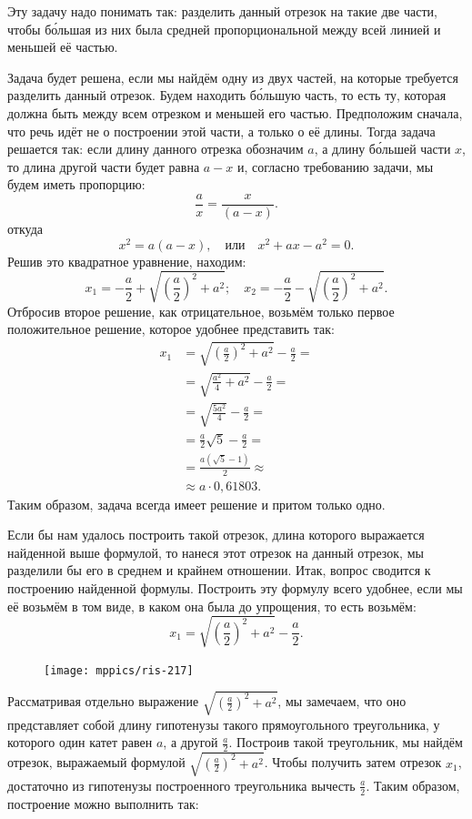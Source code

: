 \documentclass[twoside]{book}
\begin{document}
Эту задачу надо понимать так:
разделить данный отрезок на такие две части, чтобы б\'{о}льшая из них была средней пропорциональной между всей линией и меньшей её частью.

Задача будет решена, если мы найдём одну из двух частей, на которые требуется разделить данный отрезок.
Будем находить б\'{о}льшую часть, то есть ту, которая должна быть  между всем отрезком и меньшей его частью.
Предположим сначала, что речь идёт не о построении этой части, а только о  её длины.
Тогда задача решается  так:
если длину данного отрезка обозначим $a$, а длину б\'{о}льшей части $x$, то длина другой части будет равна $a-x$ и, согласно требованию задачи, мы будем иметь пропорцию:
\[\frac ax=\frac x{(a-x)}.\]
откуда
\[x^2=a(a-x),
\quad\text{или}\quad
x^2+ax-a^2=0.\]
Решив это квадратное уравнение, находим:
\[
x_1=-\frac a2 + \sqrt{\left(\frac a2\right)^2+a^2};
\quad
x_2=-\frac a2 - \sqrt{\left(\frac a2\right)^2+a^2}.
\]
Отбросив второе решение, как отрицательное, возьмём только первое положительное решение, которое удобнее представить так:
\begin{align*}
x_1&= \sqrt{\left(\frac a2\right)^2+a^2}-\frac a2 =
\\
&= \sqrt{\frac {a^2}4+a^2}-\frac a2 =
\\
&= \sqrt{\frac {5a^2}4}-\frac a2 =
\\
&= \frac a2\sqrt{5}-\frac a2 =
\\
&= \frac {a(\sqrt{5}-1)}2 \approx
\\
&\approx a\cdot 0{,}61803.
\end{align*}
Таким образом, задача всегда имеет решение и притом только одно.

Если бы нам удалось построить такой отрезок, длина которого выражается найденной выше формулой, то нанеся этот отрезок на данный отрезок, мы разделили бы его в среднем и крайнем отношении.
Итак, вопрос сводится к построению найденной формулы.
Построить эту формулу всего удобнее, если мы её возьмём в том виде, в каком она была до упрощения, то есть возьмём:
\[x_1= \sqrt{\left(\frac a2\right)^2+a^2}-\frac a2.\]

\begin{figure}
\centering
\texttt{[image: mppics/ris-217]}
\caption{}\label{1938/ris-217}
\end{figure}

\noindent
Рассматривая отдельно выражение $\sqrt{(\frac a2)^2+a^2}$, мы замечаем, что оно представляет собой длину гипотенузы такого прямоугольного треугольника, у которого один катет равен $a$, а другой $\frac a2$.
Построив такой треугольник, мы найдём отрезок, выражаемый формулой $\sqrt{(\frac a2)^2+a^2}$.
Чтобы получить затем отрезок $x_1$, достаточно из гипотенузы построенного треугольника вычесть $\frac a2$.
Таким образом, построение можно выполнить так:
\end{document}
